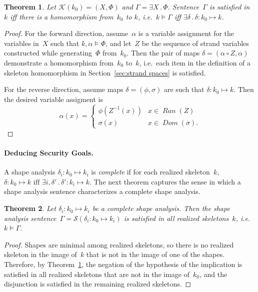 \documentclass[12pt]{article}
\newtheorem{thm}{Theorem}
\newcommand{\fn}[1]{\ensuremath{\operatorname{\mathit{#1}}}}
\newcommand{\sdom}{\fn{Dom}}
\newcommand{\sran}{\fn{Ran}}
\newcommand{\some}[1]{\exists#1\mathpunct.}
\newcommand{\form}{\mathcal{K}}
\newcommand{\sent}{\mathcal{S}}
\begin{document}
\begin{thm}\label{thm:skeleton models}
Let $\form(k_0)=(X,\Phi)$ and $\Gamma=\some{X}\Phi$.  Sentence~$\Gamma$ is
satisfied in~$k$ iff there is a homomorphism from~$k_0$ to
$k$, i.e.\ $k\models\Gamma$ iff
$\some{\delta}\delta\colon k_0\mapsto k$.
\end{thm}

\begin{proof}
For the forward direction, assume~$\alpha$ is a variable assignment
for the variables in~$X$ such that $k,\alpha\models\Phi$, and let~$Z$
be the sequence of strand variables constructed while
generating~$\Phi$ from~$k_0$.  Then the pair of maps
$\delta=(\alpha\circ Z,\alpha)$ demonstrate a homomorphism from~$k_0$
to~$k$, i.e.\ each item in the definition of a skeleton homomorphism
in Section~\ref{sec:strand spaces} is satisfied.

For the reverse direction, assume maps $\delta=(\phi,\sigma)$ are such
that $\delta\colon k_0\mapsto k$.  Then the desired variable assigment is
$$\alpha(x)=\left\{
\begin{array}{ll}
\phi(Z^{-1}(x))&x\in\sran(Z)\\
\sigma(x)&x\in\sdom(\sigma).
\end{array}\right.$$
\end{proof}

\paragraph{Deducing Security Goals.}  A shape analysis $\delta_i\colon
k_0\mapsto k_i$ is \emph{complete} if for each realized skeleton~$k$,
$\delta\colon k_0\mapsto k\mbox{ iff }\some{i,\delta'}\delta'\colon
k_i\mapsto k$.  The next theorem captures the sense in which a shape
analysis sentence characterizes a complete shape analysis.

\begin{thm}\label{thm:sentence implies}
Let $\delta_i\colon k_0\mapsto k_i$ be a complete shape analysis.
Then the shape analysis sentence~$\Gamma=\sent(\delta_i\colon
k_0\mapsto k_i)$ is satisfied in all realized skeletons~$k$,
i.e.\ $k\models\Gamma$.
\end{thm}

\begin{proof}
Shapes are minimal among realized skeletons, so there is no realized
skeleton in the image of~$k$ that is not in the image of one of the
shapes.  Therefore, by Theorem~\ref{thm:skeleton models}, the negation
of the hypothesis of the implication is satisfied in all realized
skeletons that are not in the image of~$k_0$, and the disjunction is
satisfied in the remaining realized skeletons.
\end{proof}
\end{document}
